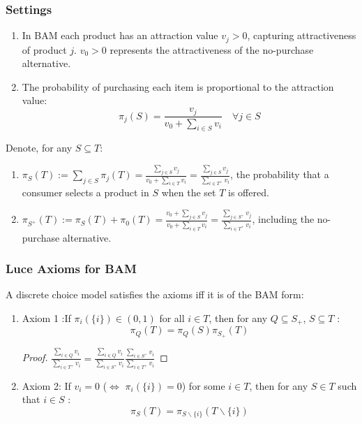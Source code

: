 \documentclass[11pt]{elegantbook}
\begin{document}
\subsubsection{Settings}
\begin{enumerate}[$\bullet$]
    \item In BAM each product has an attraction value $v_j > 0$, capturing attractiveness of product $j$. $v_0>0$ represents the attractiveness of the no-purchase alternative.
    \item The probability of purchasing each item is proportional to the attraction value: $$\pi_j(S)=\frac{v_j}{v_0+\sum_{i\in S}v_i}\quad \forall j\in S$$
\end{enumerate}
Denote, for any $S \subseteq T$:
\begin{enumerate}[$\bullet$]
    \item $\pi_{S}(T):=\sum_{j \in S} \pi_{j}(T)=\frac{\sum_{j \in S}v_j}{v_0+\sum_{i\in T}v_i}=\frac{\sum_{j \in S}v_j}{\sum_{i\in T^+}v_i}$, the probability that a consumer selects a product in $S$ when the set $T$ is offered.
    \item $\pi_{S^{+}}(T):=\pi_{S}(T)+\pi_{0}(T)=\frac{v_0+\sum_{j \in S}v_j}{v_0+\sum_{i\in T}v_i}=\frac{\sum_{j \in S^+}v_j}{\sum_{i\in T^+}v_i}$, including the no-purchase alternative.
\end{enumerate}
\subsubsection{Luce Axioms for BAM}
A discrete choice model satisfies the axioms iff it is of the BAM form:
\begin{enumerate}[$\bullet$]
    \item Axiom 1 :If $\pi_{i}(\{i\}) \in(0,1)$ for all $i \in T$, then for any $Q \subseteq S_{+}$, $S \subseteq T$ :
    $$
    \pi_{Q}(T)=\pi_{Q}(S) \pi_{S_{+}}(T)
    $$
    \begin{proof}
    $\frac{\sum_{i \in Q}v_i}{\sum_{i\in T^+}v_i}=\frac{\sum_{i \in Q}v_i}{\sum_{i\in S^+}v_i}\frac{\sum_{i \in S^+}v_i}{\sum_{i\in T^+}v_i}$
    \end{proof}
    \item Axiom 2: If $v_i=0$ ($\Leftrightarrow$ $\pi_{i}(\{i\})=0$) for some $i \in T$, then for any $S \in T$ such that $i \in S$ :
    $$
    \pi_{S}(T)=\pi_{S \backslash\{i\}}(T \backslash\{i\})
    $$
\end{enumerate}
\end{document}
